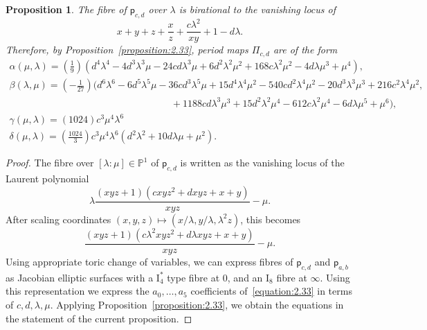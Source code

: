 \documentclass[10pt]{amsart}
\numberwithin{equation}{section}
\theoremstyle{plain}
\newtheorem{proposition}[theorem]{Proposition}
\theoremstyle{definition}
\theoremstyle{remark}
\begin{document}
\begin{proposition}\label{proposition:228}
  The fibre of \(\mathsf{p}_{c,d}\) over \(\lambda\) is birational to the vanishing locus of
  \[
    x + y+ z + \dfrac{x}{z} + \dfrac{c\lambda^2}{xy} + 1 - d\lambda.
  \]
  Therefore, by Proposition~\ref{proposition:2.33}, period maps \(\Pi_{c,d}\) are of the form
  \[
    \begin{array}{l}
      \alpha(\mu,\lambda) = \left(\frac{1}{9}\right)  (d^{4} \lambda^{4} - 4 d^{3} \lambda^{3} \mu - 24 c d \lambda^{3} \mu + 6 d^{2} \lambda^{2} \mu^{2} + 168 c \lambda^{2} \mu^{2} - 4 d \lambda \mu^{3} + \mu^{4}), \\
      \beta(\lambda,\mu) = \left(-\frac{1}{27}\right)  (d^{6} \lambda^{6} - 6 d^{5} \lambda^{5} \mu - 36 c d^{3} \lambda^{5} \mu + 15 d^{4} \lambda^{4} \mu^{2} - 540 c d^{2} \lambda^{4} \mu^{2} - 20 d^{3} \lambda^{3} \mu^{3} + 216 c^{2} \lambda^{4} \mu^{2},
      \\ \hspace{7cm}+ 1188 c d \lambda^{3} \mu^{3} + 15 d^{2} \lambda^{2} \mu^{4} - 612 c \lambda^{2} \mu^{4} - 6 d \lambda \mu^{5} + \mu^{6}), \\
      \gamma(\mu,\lambda)  = \left(1024\right)  c^{3} \mu^{4} \lambda^{6}\\
      \delta(\mu,\lambda)= \left(\frac{1024}{3}\right)  c^{3}  \mu^{4}  \lambda^{6} (d^{2} \lambda^{2} + 10 d \lambda \mu + \mu^{2}).
    \end{array}
  \]
\end{proposition}

\begin{proof}
  The fibre over \([\lambda:\mu]\in \mathbb{P}^1 \) of \(\mathsf{p}_{c,d}\) is written as the vanishing locus of the Laurent polynomial
  \[
    \lambda \dfrac{(xyz + 1) (cxyz^2 + dxyz + x + y)}{xyz} - \mu.
  \]
  After scaling coordinates \((x,y,z)\mapsto (x/\lambda,y/\lambda,\lambda ^2z)\), this becomes
  \[
    \dfrac{(xyz + 1) (c\lambda^2xyz^2 + d\lambda xyz + x + y)}{xyz} - \mu.
  \]
  Using appropriate toric change of variables, we can express fibres of \(\mathsf{p}_{c,d}\) and \(\mathsf{p}_{a,b}\) as Jacobian elliptic surfaces with a \(\mathrm{I}_4^*\) type fibre at 0, and an \(\mathrm{I}_8\) fibre at \(\infty\). Using this representation we express the \(a_0, \ldots, a_5\) coefficients of~\eqref{equation:2.33} in terms of \(c,d,\lambda,\mu\). Applying Proposition~\ref{proposition:2.33}, we obtain the equations in the statement of the current proposition.
\end{proof}
\end{document}
